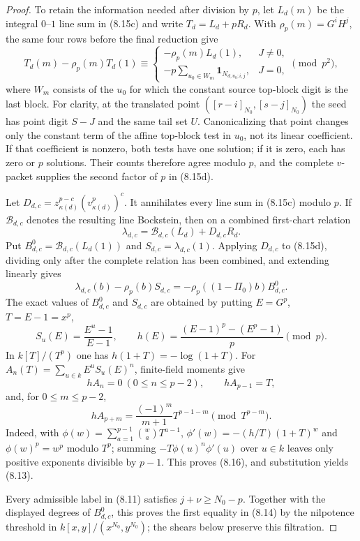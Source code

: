 \documentclass[12pt,a4paper]{article}
\theoremstyle{definition}
\begin{document}
\begin{proof}
 To retain the information needed after division by $p$, let $L_d(m)$ be the
 integral $0$--$1$ line sum in (8.15c) and write
 $T_d=L_d+pR_d$.  With $\rho_p(m)=G^iH^j$, the same four rows before the
 final reduction give
 \[
  T_d(m)-\rho_p(m)T_d(1)\equiv
  \begin{cases}
  -\rho_p(m)L_d(1),&J\ne0,\\
  -p\displaystyle\sum_{u_0\in W_m}
       \mathbf1_{N_{d,u_0;i,j}},&J=0,
  \end{cases}
  \pmod {p^2},
 \tag{8.15d}
 \]
 where $W_m$ consists of the $u_0$ for which the constant source top-block
 digit is the last block.  For clarity, at the translated point
 $([r-i]_{N_0},[s-j]_{N_0})$ the seed has point digit $S-J$ and the same
 tail set $U$.  Canonicalizing that point changes only the constant term of
 the affine top-block test in $u_0$, not its linear coefficient.  If that
 coefficient is nonzero, both tests have one solution; if it is zero, each
 has zero or $p$ solutions.  Their counts therefore agree modulo $p$, and
 the complete $v$-packet supplies the second factor of $p$ in (8.15d).

 Let
 $D_{d,c}=z_{\kappa(d)}^{p-c}(v_{\kappa(d)}^p)^c$.  It annihilates every
 line sum in (8.15c) modulo $p$.  If $\mathcal B_{d,c}$ denotes the resulting
 line Bockstein, then on a combined first-chart relation
 \[
  \lambda_{d,c}=\mathcal B_{d,c}(L_d)+D_{d,c}R_d.
 \]
 Put $B^0_{d,c}=\mathcal B_{d,c}(L_d(1))$ and
 $S_{d,c}=\lambda_{d,c}(1)$.  Applying $D_{d,c}$ to (8.15d), dividing only
 after the complete relation has been combined, and extending linearly gives
 \[
  \lambda_{d,c}(b)-\rho_p(b)S_{d,c}
  =-\rho_p((1-\Pi_0)b)B^0_{d,c}.
 \tag{8.15e}
 \]
 The exact values of $B^0_{d,c}$ and $S_{d,c}$ are obtained by putting
$E=G^p$, $T=E-1=x^p$,
\[
 S_u(E)=\frac{E^u-1}{E-1},\qquad
 h(E)=\frac{(E-1)^p-(E^p-1)}p\pmod p.
\]
In $k[T]/(T^p)$ one has $h(1+T)=-\log(1+T)$.  For
$A_n(T)=\sum_{u\in k}E^uS_u(E)^n$, finite-field moments give
\[
 hA_n=0\ (0\leq n\leq p-2),\qquad hA_{p-1}=T,
\]
and, for $0\leq m\leq p-2$,
\[
 hA_{p+m}=\frac{(-1)^m}{m+1}T^{p-1-m}\pmod{T^{p-m}}.
 \tag{8.16}
\]
Indeed, with
$\phi(w)=\sum_{a=1}^{p-1}\binom waT^{a-1}$,
$\phi'(w)=-(h/T)(1+T)^w$ and $\phi(w)^p=w^p$ modulo $T^p$; summing
$-T\phi(u)^n\phi'(u)$ over $u\in k$ leaves only positive exponents
divisible by $p-1$.  This proves (8.16), and substitution yields (8.13).

Every admissible label in (8.11) satisfies $j+\nu\geq N_0-p$.  Together
with the displayed degrees of $B^0_{d,c}$, this proves the first equality
in (8.14) by the nilpotence threshold in
$k[x,y]/(x^{N_0},y^{N_0})$; the shears below preserve this filtration.


\end{proof}
\end{document}
